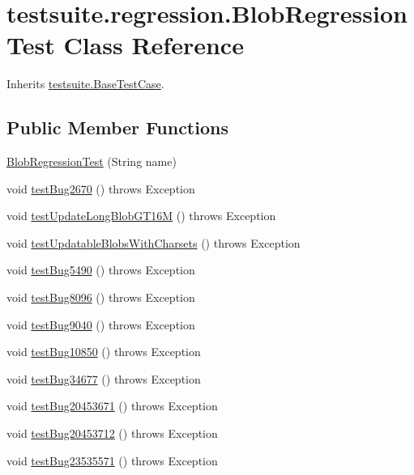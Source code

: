 \hypertarget{classtestsuite_1_1regression_1_1_blob_regression_test}{}\section{testsuite.\+regression.\+Blob\+Regression\+Test Class Reference}
\label{classtestsuite_1_1regression_1_1_blob_regression_test}


Inherits \mbox{\hyperlink{classtestsuite_1_1_base_test_case}{testsuite.\+Base\+Test\+Case}}.

\subsection*{Public Member Functions}
\begin{DoxyCompactItemize}
\item 
\mbox{\hyperlink{classtestsuite_1_1regression_1_1_blob_regression_test_a960d4c157630ea6a429f73ee43ca0c3a}{Blob\+Regression\+Test}} (String name)
\item 
void \mbox{\hyperlink{classtestsuite_1_1regression_1_1_blob_regression_test_ade5e73c4533b3bad28500f3ece35dc94}{test\+Bug2670}} ()  throws Exception 
\item 
void \mbox{\hyperlink{classtestsuite_1_1regression_1_1_blob_regression_test_a25e07d454d6ad14097ae4b5c5b1bab10}{test\+Update\+Long\+Blob\+G\+T16M}} ()  throws Exception 
\item 
void \mbox{\hyperlink{classtestsuite_1_1regression_1_1_blob_regression_test_aa201dca2fdcf014a75210d531656ab98}{test\+Updatable\+Blobs\+With\+Charsets}} ()  throws Exception 
\item 
void \mbox{\hyperlink{classtestsuite_1_1regression_1_1_blob_regression_test_adbc904fc8caf8de0ac099afb41d6daa6}{test\+Bug5490}} ()  throws Exception 
\item 
void \mbox{\hyperlink{classtestsuite_1_1regression_1_1_blob_regression_test_aff4364ccb7977bcf4f76faf8ebd1a8b2}{test\+Bug8096}} ()  throws Exception 
\item 
void \mbox{\hyperlink{classtestsuite_1_1regression_1_1_blob_regression_test_ac14a4cb77c1dd15dae977435a20e0880}{test\+Bug9040}} ()  throws Exception 
\item 
void \mbox{\hyperlink{classtestsuite_1_1regression_1_1_blob_regression_test_aacebe8bab74613e526801a7f2ab209d5}{test\+Bug10850}} ()  throws Exception 
\item 
void \mbox{\hyperlink{classtestsuite_1_1regression_1_1_blob_regression_test_a921017ea8c988a3aa23f89888cdde3cb}{test\+Bug34677}} ()  throws Exception 
\item 
void \mbox{\hyperlink{classtestsuite_1_1regression_1_1_blob_regression_test_a3e0ce3dcc8dd672e82db74e248d09044}{test\+Bug20453671}} ()  throws Exception 
\item 
void \mbox{\hyperlink{classtestsuite_1_1regression_1_1_blob_regression_test_a044b5dc71a945042d8533a95202d17c4}{test\+Bug20453712}} ()  throws Exception 
\item 
void \mbox{\hyperlink{classtestsuite_1_1regression_1_1_blob_regression_test_ab579f7995a1a9323124bd8ecff9665c8}{test\+Bug23535571}} ()  throws Exception 
\end{DoxyCompactItemize}
